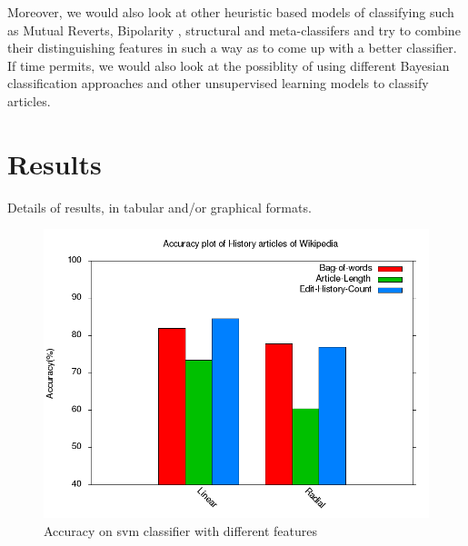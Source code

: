 \documentclass[twocolumn]{article}
\newcommand{\comment}[1]{}
\begin{document}
  Moreover, we would also look at other heuristic based
models of classifying such as Mutual Reverts, Bipolarity , structural
and meta-classifers and try to combine their distinguishing features
in such a way as to come up with a better classifier. If time permits,
we would also look at the possiblity of using different Bayesian
classification approaches and other unsupervised learning models to
classify articles. 

 \comment{

 Use the following format for figures:

 \begin{figure}[t]
         \centering
         \texttt{[image: figure\_file]}
         \caption{This figure explains this.}
         \label{fig:block}
 \end{figure}

 And refer as Figure \ref{fig:block}.

 }
 \section{Results}

 Details of results, in tabular and/or graphical formats.

 \begin{figure}[t]
         \centering
         \includegraphics[width=0.95\columnwidth]{accuracy_plot.png}
         \caption{Accuracy on svm classifier with different features}
         \label{fig:block}
 \end{figure}
 
\end{document}
